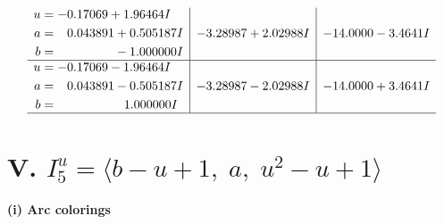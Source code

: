 \documentclass[1p]{elsarticle_modified}
\theoremstyle{definition}
\begin{document}
$$\begin{array}{c|c|c}
\begin{aligned}
u &= -0.17069 + 1.96464 I \\
a &= \phantom{-}0.043891 + 0.505187 I \\
b &= \phantom{-0.000000 } -1.000000 I\end{aligned}
 & -3.28987 + 2.02988 I & -14.0000 - 3.4641 I \\ \hline\begin{aligned}
u &= -0.17069 - 1.96464 I \\
a &= \phantom{-}0.043891 - 0.505187 I \\
b &= \phantom{-0.000000 -}1.000000 I\end{aligned}
 & -3.28987 - 2.02988 I & -14.0000 + 3.4641 I\\
 \hline 
 \end{array}$$\newpage\newpage\renewcommand{\arraystretch}{1}
\centering \section*{V. $I^u_{5}= \langle b- u+1,\;a,\;u^2- u+1 \rangle$}
\flushleft \textbf{(i) Arc colorings}\\
\end{document}
